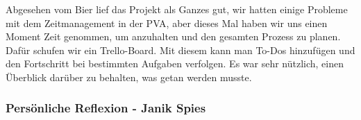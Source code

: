 Abgesehen vom Bier lief das Projekt als Ganzes gut, wir hatten einige Probleme mit dem Zeitmanagement in der PVA, aber dieses Mal haben wir uns einen Moment Zeit genommen, um anzuhalten und den gesamten Prozess zu planen. Dafür schufen wir ein Trello-Board. Mit diesem kann man To-Dos hinzufügen und den Fortschritt bei bestimmten Aufgaben verfolgen. Es war sehr nützlich, einen Überblick darüber zu behalten, was getan werden musste.

\subsubsection{Persönliche Reflexion - Janik Spies}
